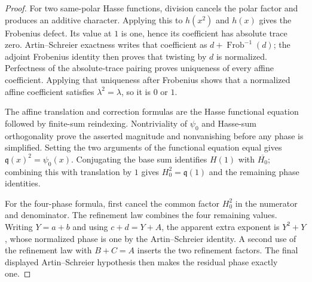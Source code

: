 \begin{proof}
For two same-polar Hasse functions, division cancels the polar factor
and produces an additive character.  Applying this to $h(x^2)$ and
$h(x)$ gives the Frobenius defect.  Its value at $1$ is one, hence its
coefficient has absolute trace zero.  Artin--Schreier exactness writes
that coefficient as $d+\operatorname{Frob}^{-1}(d)$; the adjoint
Frobenius identity then proves that twisting by $d$ is normalized.
Perfectness of the absolute-trace pairing proves uniqueness of every
affine coefficient.  Applying that uniqueness after Frobenius shows
that a normalized affine coefficient satisfies $\lambda^2=\lambda$,
so it is $0$ or $1$.

The affine translation and correction formulas are the Hasse functional
equation followed by finite-sum reindexing.  Nontriviality of $\psi_0$
and Hasse-sum orthogonality prove the asserted magnitude and nonvanishing
before any phase is simplified.  Setting the two arguments of the
functional equation equal gives $\mathfrak q(x)^2=\psi_0(x)$.
Conjugating the base sum identifies $H(1)$ with $\overline{H_0}$;
combining this with translation by $1$ gives
$H_0^2=\mathfrak q(1)$ and the remaining phase identities.

For the four-phase formula, first cancel the common factor $H_0^2$ in
the numerator and denominator.  The refinement law combines the four
remaining values.  Writing $Y=a+b$ and using $c+d=Y+A$, the apparent
extra exponent is $Y^2+Y$, whose normalized phase is one by the
Artin--Schreier identity.  A second use of the refinement law with
$B+C=A$ inserts the two refinement factors.  The final displayed
Artin--Schreier hypothesis then makes the residual phase exactly one.
\end{proof}
